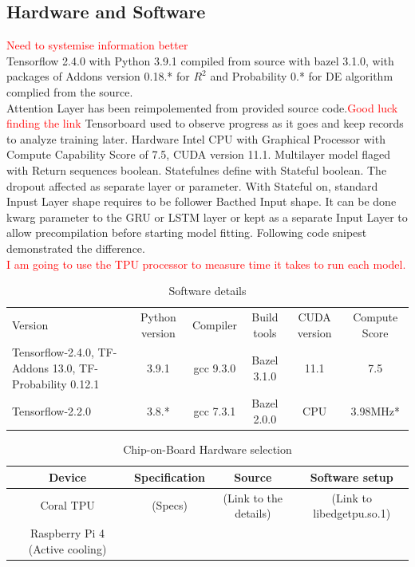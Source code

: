 \subsection{Hardware and Software} \label{subsec:soft}
\textcolor{red}{Need to systemise information better} \\
Tensorflow 2.4.0 with Python 3.9.1 compiled from source with bazel 3.1.0, with packages of Addons version 0.18.* for $R^2$ and Probability 0.* for DE algorithm complied from the source. \\
Attention Layer has been reimpolemented from provided source code.\textcolor{red}{Good luck finding the link}
Tensorboard used to observe progress as it goes and keep records to analyze training later.
Hardware Intel CPU with Graphical Processor with Compute Capability Score of 7.5, CUDA version 11.1.
Multilayer model flaged with Return sequences boolean. Statefulnes define with Stateful boolean. The dropout affected as separate layer or parameter. With Stateful on, standard Inpust Layer shape requires to be follower Bacthed Input shape. It can be done kwarg parameter to the GRU or LSTM layer or kept as a separate Input Layer to allow precompilation before starting model fitting. Following code snipest demonstrated the difference. \\
\textcolor{red}{I am going to use the TPU processor to measure time it takes to run each model.} \\
\begin{table}[ht]
    \centering
    \caption{Software details}
    \label{tab:my_label}
    \begin{tabular}{p{3.0cm}|c|c|c|c|c}
        Version & Python version & Compiler & Build tools & CUDA version & Compute Score\\
        Tensorflow-2.4.0, TF-Addons 13.0, TF-Probability 0.12.1 & 3.9.1 & gcc 9.3.0 & Bazel 3.1.0 & 11.1 & 7.5\\
        \hline
        Tensorflow-2.2.0 & 3.8.* & gcc 7.3.1 & Bazel 2.0.0 & CPU & 3.98MHz*
    \end{tabular}
\end{table}
\begin{table}[]
    \centering
    \caption{Chip-on-Board Hardware selection}
    \label{tab:my_label}
    \begin{tabular}{c|c|c|c}
        Device & Specification & Source & Software setup \\
        \hline
        Coral TPU & (Specs) & (Link to the details) & (Link to libedgetpu.so.1) \\
        \hline
        Raspberry Pi 4 (Active cooling) & 
    \end{tabular}
\end{table}